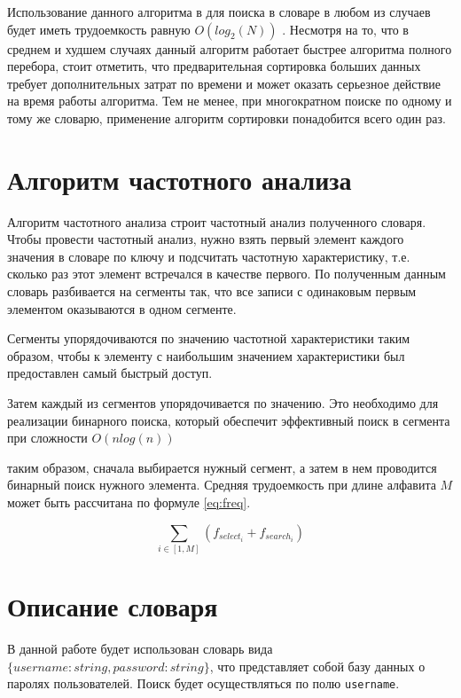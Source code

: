 Использование данного алгоритма в для поиска в словаре в любом из случаев будет иметь трудоемкость равную $O(log_2(N))$ \cite{knut}. Несмотря на то, что в среднем и худшем случаях данный алгоритм работает быстрее алгоритма полного перебора, стоит отметить, что предварительная сортировка больших данных требует дополнительных затрат по времени и может оказать серьезное действие на время работы алгоритма. Тем не менее, при многократном поиске по одному и тому же словарю, применение алгоритм сортировки понадобится всего один раз.

\section{Алгоритм частотного анализа}

Алгоритм частотного анализа строит частотный анализ полученного словаря. Чтобы провести частотный анализ, нужно взять первый элемент каждого значения в словаре по ключу и подсчитать частотную характеристику, т.е. сколько раз этот элемент встречался в качестве первого. По полученным данным словарь разбивается на сегменты так, что все записи с одинаковым первым элементом оказываются в одном сегменте.

Сегменты упорядочиваются по значению частотной характеристики таким образом, чтобы к элементу с наибольшим значением характеристики был предоставлен самый быстрый доступ.

Затем каждый из сегментов упорядочивается по значению. Это необходимо для реализации бинарного поиска, который обеспечит эффективный поиск в сегмента при сложности $O(nlog(n))$

таким образом, сначала выбирается нужный сегмент, а затем в нем проводится бинарный поиск  нужного элемента. Средняя трудоемкость при длине алфавита $M$ может быть рассчитана по формуле \eqref{eq:freq}.

\begin{equation}
   \sum_{i \in [1, M]} (f_{select_i} + f_{search_i})
   \label{eq:freq}
\end{equation}

\section{Описание словаря}

В данной работе будет использован словарь вида $\{username: string, password: string\}$, что представляет собой базу данных о паролях пользователей. Поиск будет осуществляться по полю \texttt{username}.

